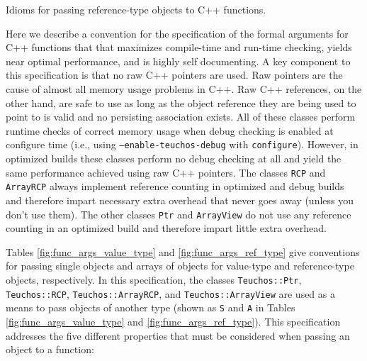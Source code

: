\documentclass[pdf,ps2pdf,11pt]{SANDreport}
\begin{document}
\begin{table}[p]
%
\begin{center}

\end{center}
\caption{\label{fig:func_args_ref_type}
Idioms for passing reference-type objects to C++ functions.}
\end{table}


Here we describe a convention for the specification of the formal
arguments for C++ functions that that maximizes compile-time and
run-time checking, yields near optimal performance, and is highly self
documenting.  A key component to this specification is that no raw C++
pointers are used.  Raw pointers are the cause of almost all memory
usage problems in C++.  Raw C++ references, on the other hand, are
safe to use as long as the object reference they are being used to
point to is valid and no persisting association exists.  All of these
classes perform runtime checks of correct memory usage when debug
checking is enabled at configure time (i.e., using
{}\texttt{--enable-teuchos-debug} with {}\texttt{configure}).
However, in optimized builds these classes perform no debug checking
at all and yield the same performance achieved using raw C++ pointers.
The classes {}\texttt{RCP} and {}\texttt{ArrayRCP} always implement
reference counting in optimized and debug builds and therefore impart
necessary extra overhead that never goes away (unless you don't use
them).  The other classes {}\texttt{Ptr} and {}\texttt{ArrayView} do
not use any reference counting in an optimized build and therefore
impart little extra overhead.

Tables {}\ref{fig:func_args_value_type} and
{}\ref{fig:func_args_ref_type} give conventions for passing single
objects and arrays of objects for value-type {} and reference-type {} objects,
respectively.  In this specification, the classes
{}\texttt{Teuchos\-::Ptr}, {}\texttt{Teuchos\-::RCP},
{}\texttt{Teuchos\-::ArrayRCP}, and {}\texttt{Teuchos\-::ArrayView}
are used as a means to pass objects of another type (shown as
{}\texttt{S} and {}\texttt{A} in Tables
{}\ref{fig:func_args_value_type} and {}\ref{fig:func_args_ref_type}).
This specification addresses the five different properties that must
be considered when passing an object to a function:
\end{document}
